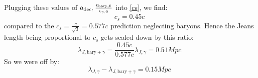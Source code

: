 Plugging these values of $a_{\text{dec}}, \frac{\epsilon_{\text{bary}, 0}}{\epsilon_{\gamma,0}}$ into \eqref{cs}, we find:
\begin{equation}
    c_s = 0.45c
\end{equation}
compared to the $c_s = \frac{c}{\sqrt{3}} = 0.577c$ prediction neglecting baryons. Hence the Jeans length being proportional to $c_s$ gets scaled down by this ratio:
\begin{equation}
    \lambda_{J, \text{bary} + \gamma} = \frac{0.45c}{0.577c} \lambda_{J, \gamma} = 0.51\si{Mpc}
\end{equation}
So we were off by:
\begin{equation}
    \boxed{\lambda_{J, \gamma} - \lambda_{J, \text{bary} + \gamma} = 0.15\si{Mpc}}
\end{equation}

